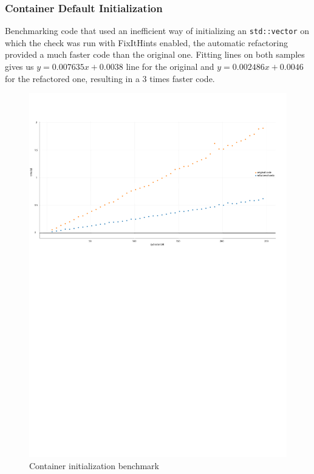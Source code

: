 \subsubsection{Container Default Initialization}
\par Benchmarking code that used an inefficient way of initializing an \verb|std::vector| on which the check was run with FixItHints enabled, the automatic refactoring provided a much faster code than the original one. Fitting lines on both samples gives us $y=0.007635x+0.0038$ line for the original and $y=0.002486x+0.0046$ for the refactored one, resulting in a 3 times faster code.
\begin{figure}[H]
	\caption{Container initialization benchmark}
	\includegraphics[scale=0.7]{images/container_init_performance.pdf}
\end{figure}
